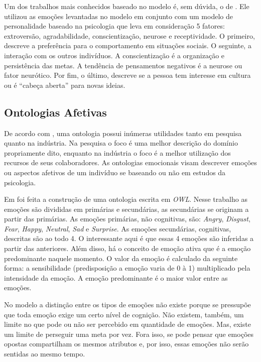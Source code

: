 Um dos trabalhos mais conhecidos baseado no modelo \occ é, sem dúvida, o de
\citet{kshirsagar2002multilayer}. Ele utilizou
as emoções levantadas no modelo em conjunto com um modelo de personalidade
baseado na psicologia que leva em consideração 5 fatores: extroversão,
agradabilidade, conscientização, neurose e receptividade. O primeiro, descreve
a preferência para o comportamento em situações sociais. O seguinte, a
interação com os outros indivíduos. A conscientização é a organização e
persistência das metas. A tendência de pensamentos negativos é a neurose ou
fator neurótico. Por fim, o último, descreve se a pessoa tem interesse em
cultura ou é ``cabeça aberta'' para novas ideias.

\subsection{Ontologias Afetivas}

De acordo com \citet{Gutierrez:2007:OVH:1229160.1229164}, uma
ontologia possui inúmeras utilidades tanto em pesquisa quanto na
indústria. Na pesquisa o foco é uma melhor descrição do domínio propriamente
dito, enquanto na indústria o foco é a melhor utilização dos recursos de seus
colaboradores. As ontologias emocionais visam descrever emoções ou aspectos
afetivos de um indivíduo se baseando ou não em estudos da psicologia.

Em \citet{benta2007ontology} foi feita a construção de uma ontologia escrita em
\emph{OWL}. Nesse trabalho as emoções são divididas em primárias e secundárias, as
secundárias se originam a partir das primárias. As emoções primárias,
não cognitivas, são: \emph{Angry}, \emph{Disgust}, \emph{Fear},
\emph{Happy}, \emph{Neutral}, \emph{Sad} e \emph{Surprise}. As emoções
secundárias, cognitivas, descritas são ao todo 4. O interessante aqui é que
essas 4 emoções são inferidas a partir das anteriores. Além disso,
há o conceito de emoção ativa que é a emoção predominante naquele momento. O
valor da emoção é calculado da seguinte forma: a sensibilidade (predisposição
a emoção varia de 0 à 1) multiplicado pela intensidade da emoção. A emoção
predominante é o maior valor entre as emoções.

No modelo \occ a distinção entre os tipos de
emoções não existe porque se pressupõe que toda emoção exige um certo nível de
cognição. Não existem, também, um limite no que pode ou não ser percebido em
quantidade de emoções. Mas, existe um limite de perseguir uma meta por vez.
Fora isso, se pode pensar que emoções opostas compartilham os mesmos atributos
e, por isso, essas emoções não serão sentidas ao mesmo tempo.

